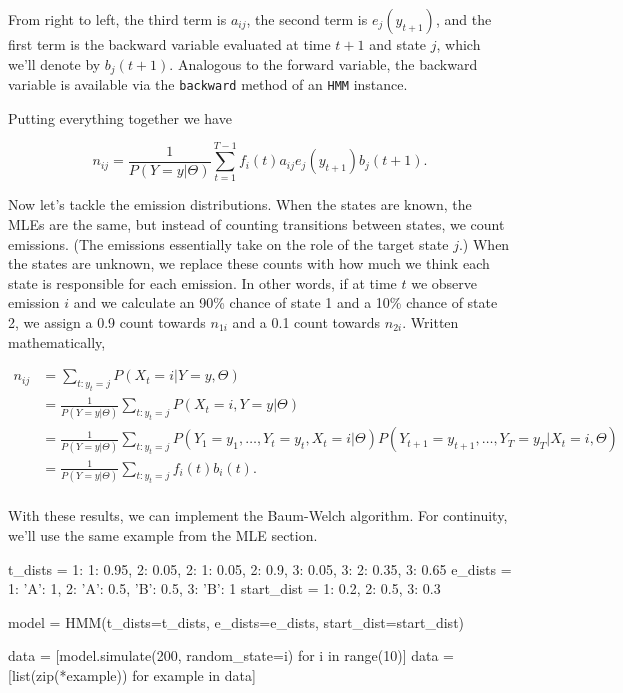 From right to left, the third term is $a_{ij}$, the second term is $e_j(y_{t+1})$, and the first term is the backward variable evaluated at time $t+1$ and state $j$, which we'll denote by $b_j(t+1)$. Analogous to the forward variable, the backward variable is available via the \texttt{backward} method of an \texttt{HMM} instance.

Putting everything together we have

\begin{equation*}
n_{ij} = \frac{1}{P(Y=y|\Theta)} \sum_{t=1}^{T-1} f_i(t)a_{ij}e_j(y_{t+1})b_j(t+1).
\end{equation*}

Now let's tackle the emission distributions. When the states are known, the MLEs are the same, but instead of counting transitions between states, we count emissions. (The emissions essentially take on the role of the target state $j$.) When the states are unknown, we replace these counts with how much we think each state is responsible for each emission. In other words, if at time $t$ we observe emission $i$ and we calculate an 90\% chance of state 1 and a 10\% chance of state 2, we assign a 0.9 count towards $n_{1i}$ and a 0.1 count towards $n_{2i}$. Written mathematically,

\begin{align*}
n_{ij}
&= \sum_{t: y_t=j} P(X_t=i|Y=y, \Theta) \\
&= \frac{1}{P(Y=y|\Theta)}
   \sum_{t: y_t=j} P(X_t=i, Y=y|\Theta) \\
&= \frac{1}{P(Y=y|\Theta)}
   \sum_{t: y_t=j} P(Y_1=y_1, \ldots, Y_t=y_t, X_t=i|\Theta)
                   P(Y_{t+1}=y_{t+1}, \ldots, Y_T=y_T| X_t=i, \Theta) \\
&= \frac{1}{P(Y=y|\Theta)}
   \sum_{t: y_t=j} f_i(t)b_i(t). \\
\end{align*}

With these results, we can implement the Baum-Welch algorithm. For continuity, we'll use the same example from the MLE section.

\begin{NotebookIn}
t_dists = {1: {1: 0.95, 2: 0.05},
           2: {1: 0.05, 2: 0.9, 3: 0.05},
           3: {2: 0.35, 3: 0.65}}
e_dists = {1: {'A': 1},
           2: {'A': 0.5, 'B': 0.5},
           3: {'B': 1}}
start_dist = {1: 0.2, 2: 0.5, 3: 0.3}

model = HMM(t_dists=t_dists, e_dists=e_dists, start_dist=start_dist)

data = [model.simulate(200, random_state=i) for i in range(10)]
data = [list(zip(*example)) for example in data]
\end{NotebookIn}

